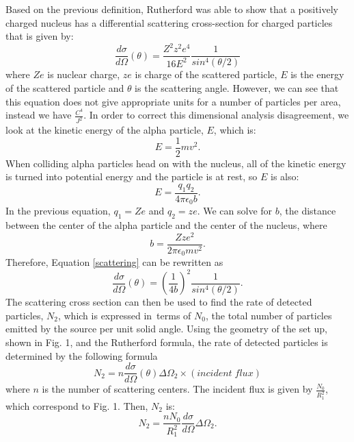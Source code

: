 Based on the previous definition, Rutherford was able to show that a positively charged nucleus has a differential scattering cross-section for charged particles that is given by:
\begin {equation}\label{scattering} \frac{d\sigma}{d\Omega}(\theta)= \frac{Z^2z^2e^4}{16E^2} \frac{1}{sin^4(\theta/2)}\end{equation} where $Ze$ is nuclear charge, $ze$ is charge of the scattered particle, $E$ is the energy of the scattered particle and $\theta$ is the scattering angle. However, we can see that this equation does not give appropriate units for a number of particles per area, instead we have $\frac{C^4}{J^2}$.
In order to correct this dimensional analysis disagreement, we look at the kinetic energy of the alpha particle, $E$, which is:
\begin{equation} E=\frac{1}{2}mv^2.\end{equation} 
When colliding alpha particles head on with the nucleus, all of the kinetic energy is turned into potential energy and the particle is at rest, so $E$ is also:
\begin{equation} E=\frac{q_1q_2}{4\pi\epsilon_0 b}.\end{equation} In the previous equation, $q_1=Ze$ and $q_2=ze$. We can solve for $b$, the distance between the center of the alpha particle and the center of the nucleus, where\begin{equation} b= \frac{Zze^2}{2\pi \epsilon_0 mv^2}.\end{equation}
Therefore, Equation \ref{scattering} can be rewritten as\begin{equation}\frac{d\sigma}{d\Omega}(\theta)=\left(\frac{1}{4b}\right)^2\frac{1}{sin^4(\theta/2)}.\end{equation}
\newline The scattering cross section can then be used to find the rate of detected particles, $N_2$, which is expressed in\ terms of $N_0$, the total number of particles emitted by the source per unit solid angle. Using the geometry of the set up, shown in Fig. 1, and the Rutherford formula, the rate of detected particles is determined by the following formula
\begin{equation} N_2=n\frac{d\sigma}{d\Omega}(\theta)\Delta\Omega_2\times (incident\;flux)\end{equation} where $n$ is the number of scattering centers. The incident flux is given by $\frac{N_0}{R_1^2}$, which correspond to Fig. 1. Then, $N_2$ is:
\begin{equation} N_2=\frac{nN_0}{R_1^2}\frac{d\sigma}{d\Omega}\Delta\Omega_2.\end{equation}

